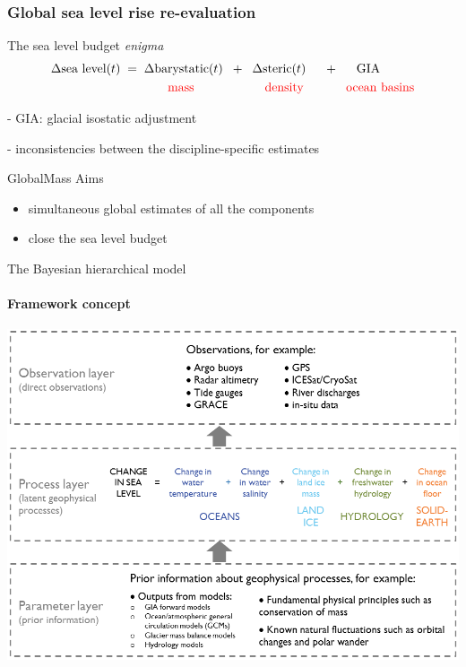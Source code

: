 \documentclass{beamer}
\begin{document}
\begin{frame}
\frametitle{Global sea level rise re-evaluation}
\begin{block}{The sea level budget \emph{enigma}}
\begin{align*}
&\Delta \mbox{sea level} (t) \hspace{0.1cm}= \hspace{0.1cm} \Delta\mbox{barystatic}(t) \hspace{0.2cm} + \hspace{0.2cm} \Delta\mbox{steric}(t) \hspace{0.5cm}+ \hspace{0.5cm} \mbox{GIA}\\
&\color{red}\hspace{3.3cm} \mbox{mass} \hspace{2cm}\mbox{density} \hspace{1.2cm} \mbox{ocean basins}
\end{align*}

- GIA: glacial isostatic adjustment

- inconsistencies between the discipline-specific estimates
\end{block}
\begin{block}{GlobalMass Aims}
\begin{itemize}
\item simultaneous global estimates of all the components
\item close the sea level budget
\end{itemize}
\end{block}

\end{frame}

\begin{frame}{The Bayesian hierarchical model}
\framesubtitle{Framework concept \citep{AZM2015}}
\vspace{0.5cm}
\centering
\includegraphics[height =0.7\textheight]{images/GMconcept-simplified}

\end{frame}
\end{document}
